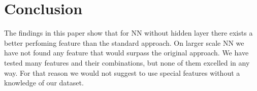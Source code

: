 \documentclass[journal]{IEEEtran}
\begin{document}
\section{Conclusion}
The findings in this paper show that for NN without hidden layer there exists a better perfoming feature than the standard approach. On larger scale NN we have not found any feature that would surpass the original approach. We have tested many features and their combinations, but none of them excelled in any way. For that reason we would not suggest to use special features without a knowledge of our dataset.


{}
\end{document}
